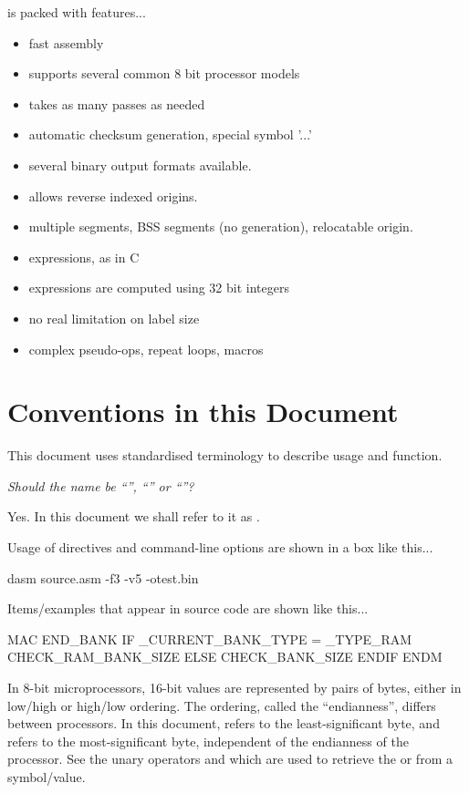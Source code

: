 \dasm is packed with features...

\begin{itemize}
	\item fast assembly
\item supports several common 8 bit processor models
\item takes as many passes as needed
\item automatic checksum generation, special symbol '...'
\item several binary output formats available.
\item allows reverse indexed origins.
\item multiple segments, BSS segments (no generation), relocatable origin.
\item expressions, as in C
\item expressions are computed using 32 bit integers
\item no real limitation on label size
\item complex pseudo-ops, repeat loops, macros
\end{itemize}


\section{Conventions in this Document}

This document uses standardised terminology to describe usage and function.

\textit{Should the name be ``'', ``'' or ``''?}

Yes. In this document we shall refer to it as \dasm.

Usage of directives and command-line options are shown in a box like this...

\begin{usage}
dasm source.asm -f3 -v5 -otest.bin
\end{usage}

Items/examples that appear in source code are shown like this...

\begin{code}
  MAC END_BANK
    IF _CURRENT_BANK_TYPE = _TYPE_RAM
      CHECK_RAM_BANK_SIZE
    ELSE
      CHECK_BANK_SIZE
    ENDIF
  ENDM
\end{code}

\label{change:lsbmsb}
In 8-bit microprocessors, 16-bit values are represented by pairs of bytes, either in low/high or high/low ordering. The ordering, called the ``endianness'', differs between processors. In this document,  refers to the least-significant byte, and  refers to the most-significant byte, independent of the endianness of the processor. See the unary operators \mono{<} and \mono{>} which are used to retrieve the  or  from a symbol/value.

